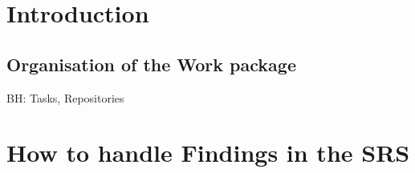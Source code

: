 \documentclass{template/openetcs_article}
\begin{document}
\section{Introduction}





\subsection{Organisation of the Work package}

BH: Tasks, Repositories






\section{How to handle Findings in the SRS}



\nocite{*}
\end{document}

